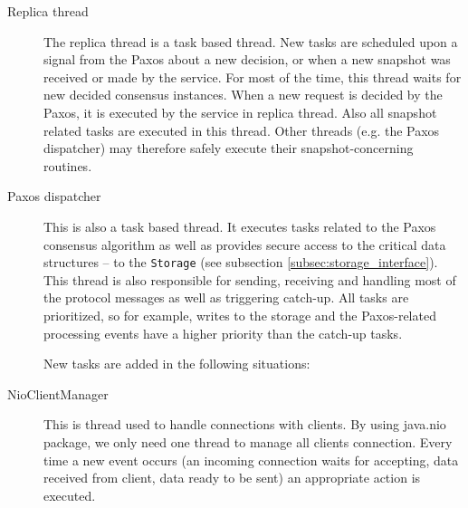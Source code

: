 \begin{description}
  \item[Replica thread] \hfill

    The replica thread is a task based thread. New tasks are scheduled upon a signal from the Paxos about a new decision, or when a new snapshot was received or made by the service. For most of the time, this thread waits for new decided consensus instances. When a new request is decided by the Paxos, it is executed by the service in replica thread. Also all snapshot related tasks are executed in this thread. Other threads (e.g. the Paxos dispatcher) may therefore safely execute their snapshot-concerning routines.
    
  \item[Paxos dispatcher] \hfill \nopagebreak
    
    This is also a task based thread. It executes tasks related to the Paxos consensus algorithm as well as provides secure access to the critical data structures -- to the \texttt{Storage} (see subsection \ref{subsec:storage_interface}). This thread is also responsible for sending, receiving and handling most of the protocol messages as well as triggering catch-up. All tasks are prioritized, so for example, writes to the storage and the Paxos-related processing events have a higher priority than the catch-up tasks.
    
    New tasks are added in the following situations:
    
  \item[NioClientManager] \hfill

    This is thread used to handle connections with clients. By using java.nio package, we only need one thread to manage all clients connection. Every time a new event occurs (an incoming connection waits for accepting, data received from client, data ready to be sent) an appropriate action is executed. 


\end{description}

